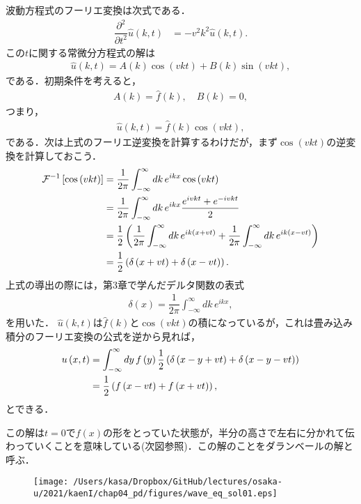 波動方程式のフーリエ変換は次式である．
\begin{align}
\dfrac{\partial^{2}}{\partial t^{2}}\hat{u}\left(k,t\right) & =-v^{2}k^{2}\hat{u}\left(k,t\right).
\end{align}
この$t$に関する常微分方程式の解は
\begin{align}
  \hat{u}(k,t) = A(k)\cos(vkt) + B(k)\sin(vkt), 
\end{align}
である．初期条件を考えると，
\begin{align}
  A(k) = \hat{f}(k), \quad B(k) = 0,
\end{align}
つまり，
\begin{align}
  \hat{u}(k,t) = \hat{f}(k)\cos(vkt), 
\end{align}
である．次は上式のフーリエ逆変換を計算するわけだが，まず$\cos(vkt)$の逆変換を計算しておこう．
\begin{align}
\mathcal{F}^{-1}\left[\cos\left(vkt\right)\right] & =\dfrac{1}{2\pi}\int_{-\infty}^{\infty}dk\,e^{ikx}\cos\left(vkt\right)\notag\\
 & =\dfrac{1}{2\pi}\int_{-\infty}^{\infty}dk\,e^{ikx}\dfrac{e^{ivkt}+e^{-ivkt}}{2}\notag\\
 & =\dfrac{1}{2}\left(\dfrac{1}{2\pi}\int_{-\infty}^{\infty}dk\,e^{ik\left(x+vt\right)}+\dfrac{1}{2\pi}\int_{-\infty}^{\infty}dk\,e^{ik\left(x-vt\right)}\right)\notag\\
 & =\dfrac{1}{2}\left(\delta\left(x+vt\right)+\delta\left(x-vt\right)\right).
\end{align}
上式の導出の際には，第3章で学んだデルタ関数の表式
\begin{align}
 \delta (x) = \dfrac{1}{2\pi}\int_{-\infty}^{\infty}dk\,e^{ikx}, 
\end{align}
を用いた．
$\hat{u}(k,t)$は$\hat{f}(k)$と$\cos(vkt)$の積になっているが，これは畳み込み積分のフーリエ変換の公式を逆から見れば，
\begin{align}
 u\left(x,t\right) & =\int_{-\infty}^{\infty}dy\,f\left(y\right)\dfrac{1}{2}\left(\delta\left(x-y+vt\right)+\delta\left(x-y-vt\right)\right)\notag\\
 & =\dfrac{1}{2}\left(f\left(x-vt\right)+f\left(x+vt\right)\right),
\end{align}
とできる．

この解は$t=0$で$f(x)$の形をとっていた状態が，半分の高さで左右に分かれて伝わっていくことを意味している(次図参照)．この解のことをダランベールの解と呼ぶ．
\begin{figure}[htbp]
 \centering
 \texttt{[image: /Users/kasa/Dropbox/GitHub/lectures/osaka-u/2021/kaenI/chap04\_pd/figures/wave\_eq\_sol01.eps]} 
\end{figure}